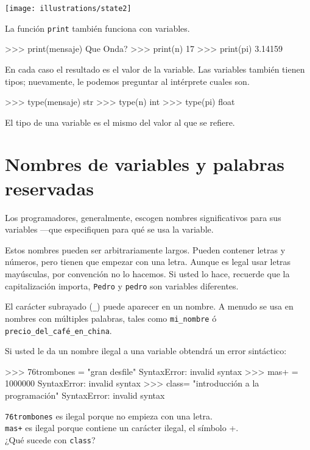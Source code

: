 \beforefig \centerline{\texttt{[image: illustrations/state2]}}
\afterfig

La función \texttt{print} también funciona con variables.

\begin{pyconcode}
>>> print(mensaje)
Que Onda?
>>> print(n)
17
>>> print(pi)
3.14159
\end{pyconcode}


En cada caso el resultado es el valor de la variable. Las variables
también tienen tipos; nuevamente, le podemos preguntar al intérprete
cuales son.

\begin{pyconcode}
>>> type(mensaje)
str
>>> type(n)
int
>>> type(pi)
float
\end{pyconcode}


El tipo de una variable es el mismo del valor al que se refiere.

\section{Nombres de variables y palabras reservadas}

 

Los programadores, generalmente, escogen nombres significativos para
sus variables —que especifiquen para qué se usa la variable.

Estos nombres pueden ser arbitrariamente largos. Pueden contener letras
y números, pero tienen que empezar con una letra. Aunque es legal
usar letras mayúsculas, por convención no lo hacemos. Si usted lo
hace, recuerde que la capitalización importa, \texttt{Pedro} y \texttt{pedro}
son variables diferentes.

El carácter subrayado (\texttt{\_}) puede aparecer en un nombre. A
menudo se usa en nombres con múltiples palabras, tales como \texttt{mi\_nombre}
ó \texttt{precio\_del\_café\_en\_china}.


Si usted le da un nombre ilegal a una variable obtendrá un error sintáctico:

\begin{pyconcode}
>>> 76trombones = "gran desfile"
SyntaxError: invalid syntax
>>> mas+ = 1000000
SyntaxError: invalid syntax
>>> class= "introducción a la programación"
SyntaxError: invalid syntax
\end{pyconcode}

\texttt{76trombones} es ilegal porque no empieza con una letra.\\
\texttt{mas+} es ilegal porque contiene un carácter ilegal, el símbolo
+.\\
¿Qué sucede con \texttt{class}?


